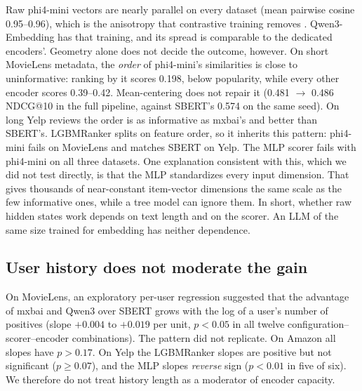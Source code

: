 \noindent Raw phi4-mini vectors are nearly parallel on every dataset
(mean pairwise cosine 0.95--0.96), which is the anisotropy that
contrastive training removes \cite{sgpt, llm2vec}. Qwen3-Embedding has
that training, and its spread is comparable to the dedicated encoders'.
Geometry alone does not decide the outcome, however. On short MovieLens
metadata, the \emph{order} of phi4-mini's similarities is close to
uninformative: ranking by it scores 0.198, below popularity, while every
other encoder scores 0.39--0.42. Mean-centering does not repair it
(0.481 $\rightarrow$ 0.486 NDCG@10 in the full pipeline, against SBERT's
0.574 on the same seed). On long Yelp reviews the order is as
informative as mxbai's and better than SBERT's. LGBMRanker splits on
feature order, so it inherits this pattern: phi4-mini fails on
MovieLens and matches SBERT on Yelp. The MLP scorer fails with
phi4-mini on all three datasets. One explanation consistent with this,
which we did not test directly, is that the MLP standardizes every
input dimension. That gives thousands of near-constant item-vector
dimensions the same scale as the few informative ones, while a tree
model can ignore them. In short, whether raw hidden states work depends
on text length and on the scorer. An LLM of the same size trained for
embedding has neither dependence.

\subsection{User history does not moderate the gain}
On MovieLens, an exploratory per-user regression suggested that the
advantage of mxbai and Qwen3 over SBERT grows with the log of a user's
number of positives (slope $+0.004$ to $+0.019$ per unit, $p<0.05$ in
all twelve configuration--scorer--encoder combinations). The pattern
did not replicate. On Amazon all slopes have $p>0.17$. On Yelp the
LGBMRanker slopes are positive but not significant ($p\geq0.07$), and
the MLP slopes \emph{reverse} sign ($p<0.01$ in five of six). We
therefore do not treat history length as a moderator of encoder
capacity.
